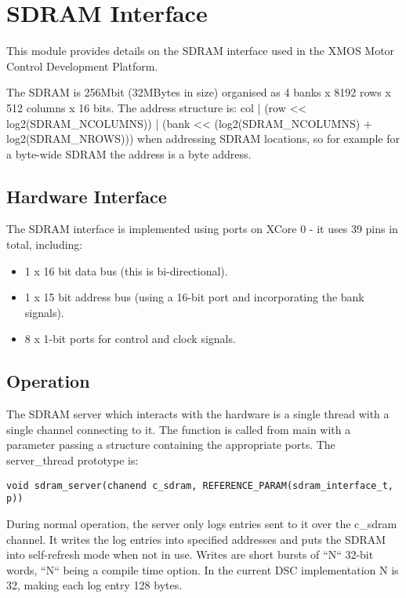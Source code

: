 \section{SDRAM Interface}
This module provides details on the SDRAM interface used in the XMOS Motor Control Development Platform.

The SDRAM is 256Mbit (32MBytes in size) organised as 4 banks x 8192 rows x 512 columns x 16 bits.
The address structure is: col | (row << log2(SDRAM\_NCOLUMNS)) | (bank << (log2(SDRAM\_NCOLUMNS) + log2(SDRAM\_NROWS))) when addressing SDRAM locations, so for example for a byte-wide SDRAM the address is a byte address.


\subsection{Hardware Interface}

The SDRAM interface is implemented using ports on XCore 0 - it uses 39 pins in total, including:
\begin{itemize}
\item 1 x 16 bit data bus (this is bi-directional).
\item 1 x 15 bit address bus (using a 16-bit port and incorporating the bank signals).
\item 8 x 1-bit ports for control and clock signals.
\end{itemize}


\subsection{Operation}

The SDRAM server which interacts with the hardware is a single thread with a single channel connecting to it.
The function is called from main with a parameter passing a structure containing the appropriate ports. The server\_thread prototype is:

\lstset{breaklines=true}
\begin{lstlisting}
void sdram_server(chanend c_sdram, REFERENCE_PARAM(sdram_interface_t, p))
\end{lstlisting}

During normal operation, the server only logs entries sent to it over the c\_sdram channel.
It writes the log entries into specified addresses and puts the SDRAM into self-refresh mode when not in use.
Writes are short bursts of ``N`` 32-bit words, ``N`` being a compile time option.
In the current DSC implementation N is 32, making each log entry 128 bytes.


